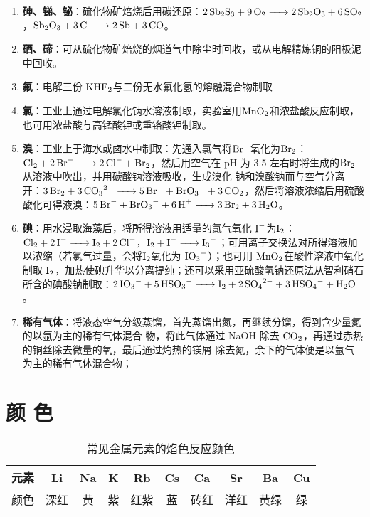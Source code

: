 \documentclass[
  10pt,
  twoside,
  openany,
  b5paper, %
  colorscheme = basic, %
  xits = false,
]{qyxf-book}
\begin{document}
\begin{enumerate}
	\item \textbf{砷、锑、铋}：硫化物矿焙烧后用碳还原：$\ce{2Sb2S3 + 9O2 -> 2Sb2O3 + 6SO2}$，$\ce{Sb2O3 + 3C -> 2Sb + 3CO}$。
	\item \textbf{硒、碲}：可从硫化物矿焙烧的烟道气中除尘时回收，或从电解精炼铜的阳极泥中回收。
	\item \textbf{氟}：电解三份 $\ce{KHF2}$与二份无水氟化氢的熔融混合物制取
	\item \textbf{氯}：工业上通过电解氯化钠水溶液制取，实验室用$\ce{MnO2}$和浓盐酸反应制取，也可用浓盐酸与高锰酸钾或重铬酸钾制取。
	\item \textbf{溴}：工业上于海水或卤水中制取：先通入氯气将$\ce{Br-}$氧化为$\ce{Br2}$：$\ce{Cl2 + 2Br- -> 2Cl- + Br2}$，然后用空气在 pH 为 3.5 左右时将生成的$\ce{Br2}$从溶液中吹出，并用碳酸钠溶液吸收，生成溴化
	钠和溴酸钠而与空气分离开：$\ce{3Br2 + 3CO3^2- -> 5Br- + BrO3- + 3CO2}$，然后将溶液浓缩后用硫酸酸化可得液溴：$\ce{5Br- + BrO3- + 6H+ -> 3Br2 + 3H2O}$。
	\item \textbf{碘}：用水浸取海藻后，将所得溶液用适量的氯气氧化 $\ce{I-}$为$\ce{I2}$：$\ce{Cl2 + 2I- -> I2 + 2Cl-}$，$\ce{I2 + I- -> I3-}$；可用离子交换法对所得溶液加以浓缩（若氯气过量，会将$\ce{I2}$氧化为 $\ce{IO3-}$）；也可用 $\ce{MnO2}$在酸性溶液中氧化制取 $\ce{I2}$，加热使碘升华以分离提纯；还可以采用亚硫酸氢钠还原法从智利硝石所含的碘酸钠制取：$\ce{2IO3- + 5HSO3- -> I2 + 2SO4^2- +3HSO4- + H2O}$。
	\item \textbf{稀有气体}：将液态空气分级蒸馏，首先蒸馏出氮，再继续分馏，得到含少量氮的以氩为主的稀有气体混合
	物，将此气体通过 NaOH 除去 $\ce{CO2}$，再通过赤热的铜丝除去微量的氧，最后通过灼热的镁屑
	除去氮，余下的气体便是以氩气为主的稀有气体混合物；
	
	
\end{enumerate}

\newpage

\section{颜 色}


\begin{table}[htbp]
	\centering
	\caption{常见金属元素的焰色反应颜色}
	\begin{tabular}{cccccccccc}
		\toprule
		  	元素 & Li & Na & K & Rb & Cs & Ca & Sr & Ba & Cu\\
		\midrule
			颜色 & 深红 & 黄 & 紫 & 红紫 & 蓝 & 砖红 & 洋红 & 黄绿 & 绿 \\
		\bottomrule
	\end{tabular}
\end{table}
\end{document}
